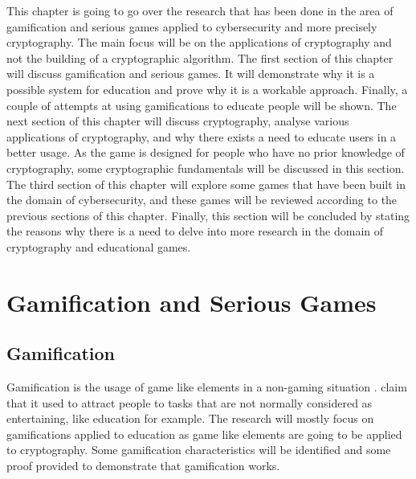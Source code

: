 \documentclass{l4proj}
\begin{document}
This chapter is going to go over the research that has been done in the area of gamification and serious games applied to cybersecurity and more precisely cryptography.
The main focus will be on the applications of cryptography and not the building of a cryptographic algorithm.
The first section of this chapter will discuss gamification and serious games. It will demonstrate why it is a possible system for education and prove why it is a workable approach.
Finally, a couple of attempts at using gamifications to educate people will be shown.
The next section of this chapter will discuss cryptography, analyse various applications of cryptography, and why there exists a need to educate users in a better usage.
As the game is designed for people who have no prior knowledge of cryptography, some cryptographic fundamentals will be discussed in this section.
The third section of this chapter will explore some games that have been built in the domain of cybersecurity, and these games will be reviewed according to the previous sections of this chapter.
Finally, this section will be concluded by stating the reasons why there is a need to delve into more research in the domain of cryptography and educational games.

\section{Gamification and Serious Games}

\subsection{Gamification}
Gamification is the usage of game like elements in a non-gaming situation \citep{aparicio_analysis_2012}.
\citet{aparicio_analysis_2012} claim that it used to attract people to tasks that are not normally considered as entertaining, like education for example.
The research will mostly focus on gamifications applied to education as game like elements are going to be applied to cryptography.
Some gamification characteristics will be identified and some proof provided to demonstrate that gamification works.
\end{document}
